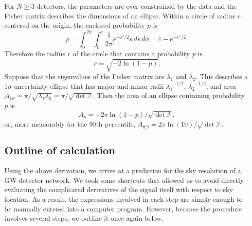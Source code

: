 \documentclass[amsmath,amssymb,aps,prx,reprint,nopreprintnumbers,nofootinbib]{revtex4-1}
\begin{document}
For $N \geq 3$ detectors, the parameters are over\nobreakdashes-constrained by the data and the Fisher matrix describes the dimensions of an ellipse. Within a circle of radius $r$ centered on the origin, the enclosed probability $p$ is
%
\begin{equation}
    p = \int_0^{2\pi} \int_0^r \frac{1}{2\pi} e^{-s^2/2} s \, ds \, d\phi = 1 - e^{-r^2/2}.
\end{equation}
%
Therefore the radius $r$ of the circle that contains a probability $p$ is
%
\begin{equation}
    r = \sqrt{-2\ln (1 - p)}.
\end{equation}
%
Suppose that the eigenvalues of the Fisher matrix are $\lambda_1$ and $\lambda_2$. This describes a $1\sigma$ uncertainty ellipse that has major and minor radii ${\lambda_1}^{-1/2}$, ${\lambda_2}^{-1/2}$, and area $A_{1\sigma} = \pi / \sqrt{\lambda_1 \lambda_2} = \pi / \sqrt{\det\mathcal{I}}$. Then the area of an ellipse containing probability $p$ is
%
\begin{equation}\label{eq:a-pth-quantile}
    A_p = -2\pi\ln(1-p) / \sqrt{\det \mathcal{I}},
\end{equation}
%
or, more memorably for the $90$th percentile, $A_{0.9} = 2\pi\ln(10) / \sqrt{\det{\mathcal{I}}}$.

\subsection{Outline of calculation}
\label{sec:fisher-matrix-area-outline}

Using the above derivation, we arrive at a prediction for the sky resolution of a \ac{GW} detector network. We took some shortcuts that allowed us to avoid directly evaluating the complicated derivatives of the signal itself with respect to sky location. As a result, the expressions involved in each step are simple enough to be manually entered into a computer program. However, because the procedure involves several steps, we outline it once again below.
\end{document}
